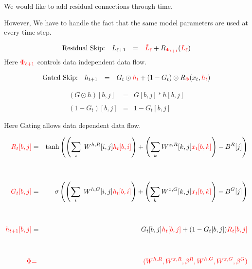 {\vfill
We would like to add {\color{red} residual connections through time}.

\vfill
However, We have to handle the fact that the same model parameters are used at every time step.



$$\begin{array}{lrcl}
\mbox{Residual Skip:} & L_{\ell+1} & = & {\color{red} \tilde{L}_\ell} + R_{\color{red} \Phi_{\ell+1}}({\color{red} L_\ell})
\end{array}$$
\vfill
Here ${\color{red} \Phi_{\ell+1}}$ controls data independent data flow.

\vfill
$$\begin{array}{lrcl}
\mbox{Gated Skip:} & h_{t+1} & = & G_t\odot {\color{red} h_t} + (1-G_t)\odot R_{\color{red} \Phi}(x_t,{\color{red} h_t}) \\
\end{array}$$

\vfill
\begin{eqnarray*}
(G\odot h)[b,j] & = & G[b,j] * h[b,j] \\
\\
(1-G_t)[b,j] & = & 1-G_t[b,j]
\end{eqnarray*}

\vfill
Here Gating allows {\color{red} data dependent data flow.}


{\huge
\begin{eqnarray*}
{\color{red} R_t[b,j]} & = & \mathrm{tanh}\left(\left(\sum_i\;W^{h,R}[i,j]{\color{red} h_t[b,i]}\right) + \left(\sum_k W^{x,R}[k,j]{\color{red} x_t[b,k]}\right) - B^R[j]\right) \\
\\
\\
{\color{red} G_t[b,j]} & = & \sigma\left(\left(\sum_i\;W^{h,G}[i,j]{\color{red} h_t[b,i]}\right) + \left(\sum_k W^{x,G}[k,j]{\color{red} x_t[b,k]}\right) - B^G[j]\right) \\
\\
\\
{\color{red} h_{t+1}[b,j]} & = & G_t[b,j]{\color{red} h_t[b,j]} + (1-G_t[b,j]){\color{red} R_t[b,j]} \\
\\
\\
{\color{red} \Phi} & {\color{red} =} & {\color{red} (W^{h,R},W^{x,R},\beta^R,W^{h,G},W^{x,G},\beta^G)}
\end{eqnarray*}
}

}
